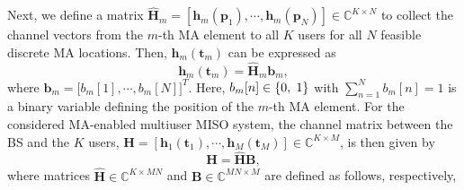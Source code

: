 \documentclass[12pt, draftclsnofoot, onecolumn]{IEEEtran}
\begin{document}
Next, we define a matrix $\hat{\mathbf{H}}_{m}=[\mathbf{h}_{m}(\mathbf{p}_1),\cdots,\mathbf{h}_{m}(\mathbf{p}_N)]\in\mathbb{C}^{K\times N}$ to collect the channel vectors from the $m$-th MA element to all $K$ users for all $N$ feasible discrete MA locations. Then, $\mathbf{h}_{m}(\mathbf{t}_m)$ can be expressed as
\begin{equation}
    \mathbf{h}_{m}(\mathbf{t}_m)=\hat{\mathbf{H}}_{m}\mathbf{b}_m,
\end{equation}
where $\mathbf{b}_m=\big[b_m[1],\cdots,b_m[N]\big]^T$. Here, $b_m[n]\in\left\{0,\hspace*{1mm}1\right\}$ with $\sum_{n=1}^{N}b_m[n]=1$ is a binary variable defining the position of the $m$-th MA element. %
For the considered MA-enabled multiuser MISO system, the channel matrix between the BS and the $K$ users, $\mathbf{H}=[\mathbf{h}_{1}(\mathbf{t}_1),\cdots,\mathbf{h}_{M}(\mathbf{t}_M)]\in\mathbb{C}^{K\times M}$, is then given by
\begin{equation}
    \mathbf{H}=\hat{\mathbf{H}}\mathbf{B},
\end{equation}
where matrices $\hat{\mathbf{H}}\in \mathbb{C}^{K\times MN}$ and $\mathbf{B}\in \mathbb{C}^{MN\times M}$ are defined as follows, respectively,
\end{document}
